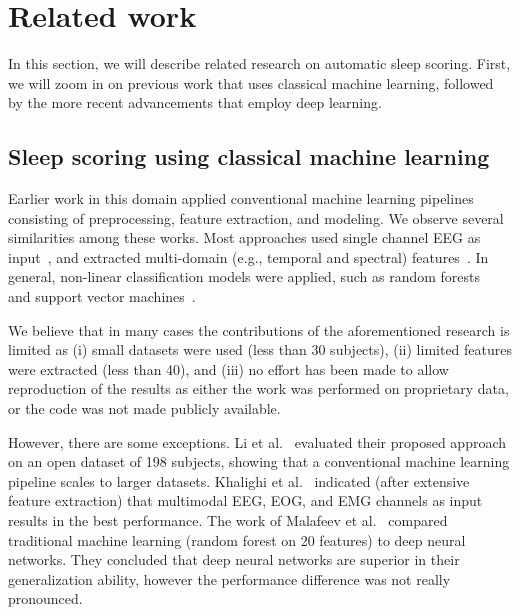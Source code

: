 \documentclass[runningheads]{llncs}
\begin{document}
\section{Related work}\label{sec:related_work}
In this section, we will describe related research on automatic sleep scoring. First, we will zoom in on previous work that uses classical machine learning, followed by the more recent advancements that employ deep learning.

\subsection{Sleep scoring using classical machine learning}
Earlier work in this domain applied conventional machine learning pipelines consisting of preprocessing, feature extraction, and modeling. We observe several similarities among these works. Most approaches used single channel EEG as input~\cite{li2017hyclasss,koley2012ensemble,hassan2017decision,alickovic2018ensemble,khalighi2013automatic,liang2012automatic}, and extracted multi-domain (e.g., temporal and spectral) features~\cite{li2017hyclasss,koley2012ensemble,lajnef2015learning,hassan2017decision,khalighi2013automatic,malafeev2018automatic}. In general, non-linear classification models were applied, such as random forests~\cite{li2017hyclasss,malafeev2018automatic} and support vector machines~\cite{koley2012ensemble,lajnef2015learning,khalighi2013automatic,alickovic2018ensemble}.

We believe that in many cases the contributions of the aforementioned research is limited as (i) small datasets were used (less than 30 subjects), (ii) limited features were extracted (less than 40), and (iii) no effort has been made to allow reproduction of the results as either the work was performed on proprietary data, or the code was not made publicly available.

However, there are some exceptions. Li et al.~\cite{li2017hyclasss} evaluated their proposed approach on an open dataset of 198 subjects, showing that a conventional machine learning pipeline scales to larger datasets. Khalighi et al.~\cite{khalighi2013automatic} indicated (after extensive feature extraction) that multimodal EEG, EOG, and EMG channels as input results in the best performance.  The work of Malafeev et al.~\cite{malafeev2018automatic} compared traditional machine learning (random forest on 20 features) to deep neural networks. They concluded that deep neural networks are superior in their generalization ability, however the performance difference was not really pronounced.  
\end{document}
